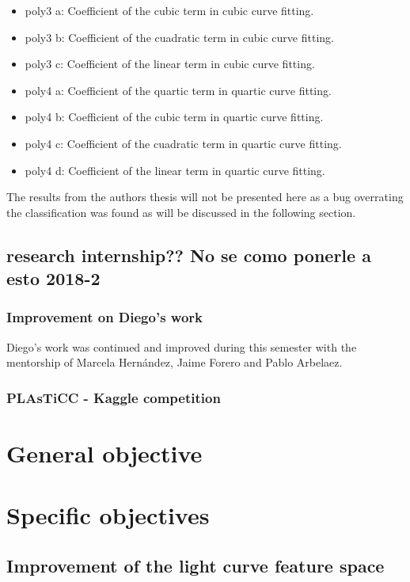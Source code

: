 \begin{itemize}
  \item poly3 a: Coefficient of the cubic term in cubic curve fitting.
  \item poly3 b: Coefficient of the cuadratic term in cubic curve fitting.
  \item poly3 c: Coefficient of the linear term in cubic curve fitting.
  \item poly4 a: Coefficient of the quartic term in quartic curve fitting.
  \item poly4 b: Coefficient of the cubic term in quartic curve fitting.
  \item poly4 c: Coefficient of the cuadratic term in quartic curve fitting.
  \item poly4 d: Coefficient of the linear term in quartic curve fitting.
\end{itemize}

The results from the authors thesis will not be presented here as a bug overrating the classification was found as will be discussed in the following section.

\subsection{research internship?? No se como ponerle a esto 2018-2}

\subsubsection{Improvement on Diego's work}\label{improvementDiego}
Diego's work was continued and improved during this semester with the mentorship of Marcela Hern\'andez, Jaime Forero and Pablo Arbelaez. 

\subsubsection{PLAsTiCC - Kaggle competition}


\section{General objective}
\section{Specific objectives}

\subsection{Improvement of the light curve feature space}

